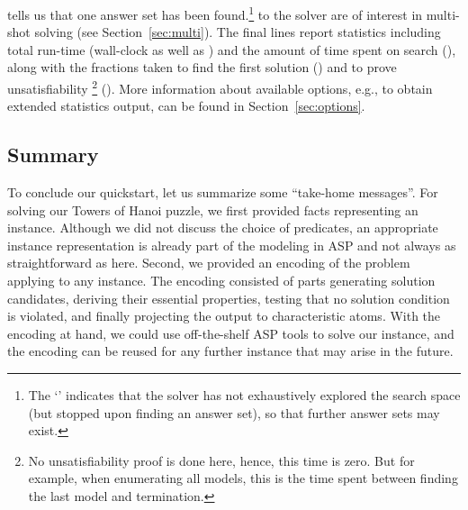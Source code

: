 tells us that one answer set has been found.\footnote{%
The `\code{+}' indicates that 
the solver has not exhaustively explored the search space
(but stopped upon finding an answer set),
so that further answer sets may exist.}
 to the solver are of interest in multi-shot solving
(see Section~\ref{sec:multi}).
The final lines report statistics including
total run-time (wall-clock  as well as ) and
the amount of time spent on search (),
along with the fractions taken to find the first solution ()
and to prove unsatisfiability%
\footnote{
No unsatisfiability proof is done here, hence, this time is zero.
But for example, when enumerating all models, this is the time spent between finding the last model and termination.
} ().
More information about available options, e.g.,
to obtain extended statistics output,
can be found in Section~\ref{sec:options}.

\subsection{Summary}

To conclude our quickstart, let us summarize some ``take-home messages''.
For solving our Towers of Hanoi puzzle, we first provided facts representing an instance.
Although we did not discuss the choice of predicates, an
appropriate instance representation is already part of the modeling in ASP and
not always as straightforward as here.
Second, we provided an encoding of the problem applying to any instance.
The encoding consisted of parts generating solution candidates,
deriving their essential properties,
testing that no solution condition is violated,
and finally projecting the output to characteristic atoms.
With the encoding at hand, we could use off-the-shelf ASP tools to solve our instance,
and the encoding can be reused for any further
instance that may arise in the future.

